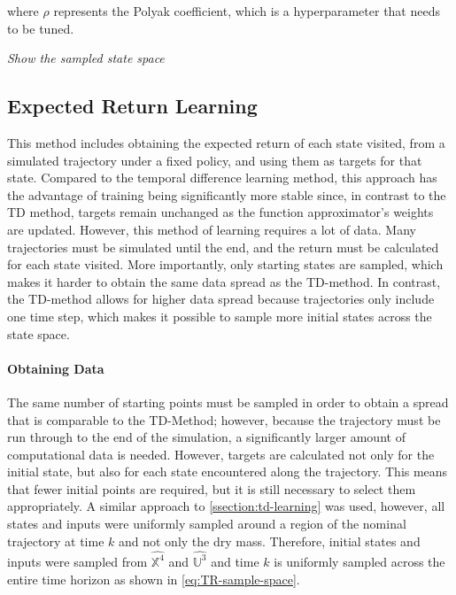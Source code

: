 where $\rho$ represents the Polyak coefficient, which is a hyperparameter that needs to be tuned.


\emph{Show the sampled state space}

\subsection{Expected Return Learning}
This method includes obtaining the expected return of each state visited, from a simulated trajectory under a fixed policy, and using them as targets for that state. Compared to the temporal difference learning method, this approach has the advantage of training being significantly more stable since, in contrast to the TD method, targets remain unchanged as the function approximator's weights are updated. However, this method of learning requires a lot of data. Many trajectories must be simulated until the end, and the return must be calculated for each state visited. More importantly, only starting states are sampled, which makes it harder to obtain the same data spread as the TD-method. In contrast, the TD-method allows for higher data spread because trajectories only include one time step, which makes it possible to sample more initial states across the state space. 

\paragraph{Obtaining Data}
The same number of starting points must be sampled in order to obtain a spread that is comparable to the TD-Method; however, because the trajectory must be run through to the end of the simulation, a significantly larger amount of computational data is needed. However, targets are calculated not only for the initial state, but also for each state encountered along the trajectory. This means that fewer initial points are required, but it is still necessary to select them appropriately. A similar approach to \autoref{ssection:td-learning} was used, however, all states and inputs were uniformly sampled around a region of the nominal trajectory at time $k$ and not only the dry mass. Therefore, initial states and inputs were sampled from $\hat{\mathbb{X}^4}$ and $\hat{\mathbb{U}^3}$ and time $k$ is uniformly sampled across the entire time horizon as shown in \autoref{eq:TR-sample-space}.

